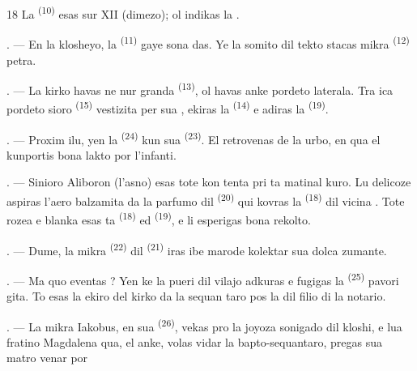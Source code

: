 \begin{VUpage}[20]{18}
\VUcontinue
{} La  \textsuperscript{(10)} esas sur XII (dimezo); ol\nl
indikas la .

. --- En la klosheyo, la  \textsuperscript{(11)} gaye sona\cc
das. Ye la somito dil tekto stacas mikra \cc
{} \textsuperscript{(12)} petra.

. --- La kirko havas ne nur granda \cc
{} \textsuperscript{(13)}, ol havas anke pordeto laterala. Tra\nl
ica pordeto sioro  \textsuperscript{(15)} vestizita per sua\nl
{}, ekiras la  \textsuperscript{(14)} e adiras la \cc
{} \textsuperscript{(19)}.

. --- Proxim ilu, yen la  \textsuperscript{(24)}\nl
kun sua  \textsuperscript{(23)}. El retrovenas de la urbo,\nl
en qua el kunportis bona lakto por l'infanti.

\VUsaut{4.0mm}
\VUsaut{3.4mm}

. --- Sinioro Aliboron (l'asno) esas tote kon\cc
tenta pri ta matinal kuro. Lu delicoze aspiras\nl
l'aero balzamita da la parfumo dil  \textsuperscript{(20)} qui\nl
kovras la  \textsuperscript{(18)} dil vicina \cc
{}. Tote rozea e blanka esas ta  \textsuperscript{(18)}\nl
ed  \textsuperscript{(19)}, e li esperigas bona rekolto.

. --- Dume, la mikra  \textsuperscript{(22)} dil \cc
{} \textsuperscript{(21)} iras ibe marode kolektar sua dolca\nl
{} zumante.

. --- Ma quo eventas ? Yen ke la pueri dil\nl
vilajo adkuras e fugigas la  \textsuperscript{(25)} pavori\cc
gita. To esas la ekiro del kirko da la sequan\cc
taro pos la  dil filio di la notario.

. --- La mikra Iakobus, en sua  \textsuperscript{(26)},\nl
vekas pro la joyoza sonigado dil kloshi, e lua\nl
fratino Magdalena qua, el anke, volas vidar la\nl
bapto-sequantaro, pregas sua matro venar por
\parplein
\end{VUpage}

